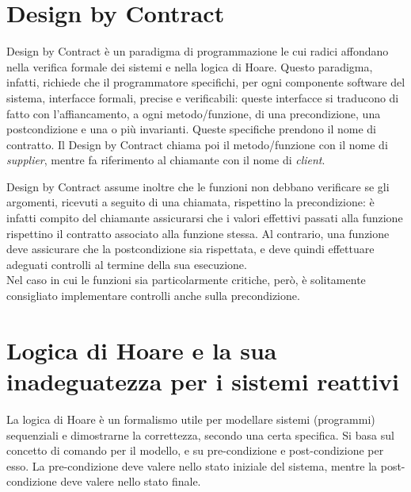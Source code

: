 \section{Design by Contract}
Design by Contract è un paradigma di programmazione le cui radici affondano
nella verifica formale dei sistemi e nella logica di Hoare.
Questo paradigma, infatti, richiede che il programmatore specifichi, per
ogni componente software del sistema, interfacce formali, precise e verificabili:
queste interfacce si traducono di fatto con l'affiancamento, a ogni metodo/funzione,
di una precondizione, una postcondizione e una o più invarianti.
Queste specifiche prendono il nome di contratto.
Il Design by Contract chiama poi il metodo/funzione con il nome di
\textit{supplier}, mentre fa riferimento al chiamante con il nome di
\textit{client}.

Design by Contract assume inoltre che le funzioni non debbano verificare
se gli argomenti, ricevuti a seguito di una chiamata, rispettino
la precondizione: è infatti compito del chiamante assicurarsi che i valori
effettivi passati alla funzione rispettino il contratto associato alla
funzione stessa.
Al contrario, una funzione deve assicurare che la postcondizione sia
rispettata, e deve quindi effettuare adeguati controlli al termine della
sua esecuzione.\\
Nel caso in cui le funzioni sia particolarmente critiche, però,
è solitamente consigliato implementare controlli anche sulla precondizione.

\section{Logica di Hoare e la sua inadeguatezza per i sistemi reattivi}
La logica di Hoare è un formalismo utile per modellare sistemi (programmi)
sequenziali e dimostrarne la correttezza, secondo una certa specifica.
Si basa sul concetto di comando per il modello, e su
pre-condizione e post-condizione per esso. La pre-condizione deve
valere nello stato iniziale del sistema, mentre la post-condizione deve
valere nello stato finale.


